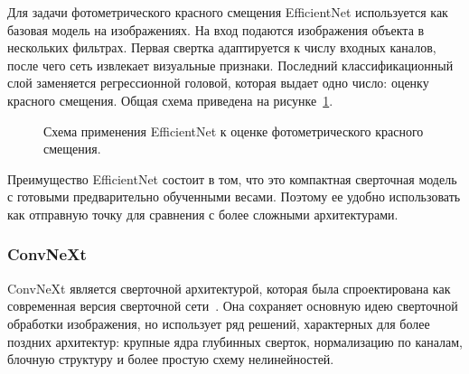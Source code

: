 \documentclass[12pt,a4paper]{article}
\begin{document}
Для задачи фотометрического красного смещения EfficientNet используется как базовая модель на изображениях. На вход подаются изображения объекта в нескольких фильтрах. Первая свертка адаптируется к числу входных каналов, после чего сеть извлекает визуальные признаки. Последний классификационный слой заменяется регрессионной головой, которая выдает одно число: оценку красного смещения. Общая схема приведена на рисунке~\ref{fig:efficientnet-scheme}.

\begin{figure}[h]
\centering
{}
\caption{Схема применения EfficientNet к оценке фотометрического красного смещения.}
\label{fig:efficientnet-scheme}
\end{figure}

Преимущество EfficientNet состоит в том, что это компактная сверточная модель с готовыми предварительно обученными весами. Поэтому ее удобно использовать как отправную точку для сравнения с более сложными архитектурами.

\subsubsection{ConvNeXt}

ConvNeXt является сверточной архитектурой, которая была спроектирована как современная версия сверточной сети~\cite{liu2022convnext}. Она сохраняет основную идею сверточной обработки изображения, но использует ряд решений, характерных для более поздних архитектур: крупные ядра глубинных сверток, нормализацию по каналам, блочную структуру и более простую схему нелинейностей.
\end{document}
